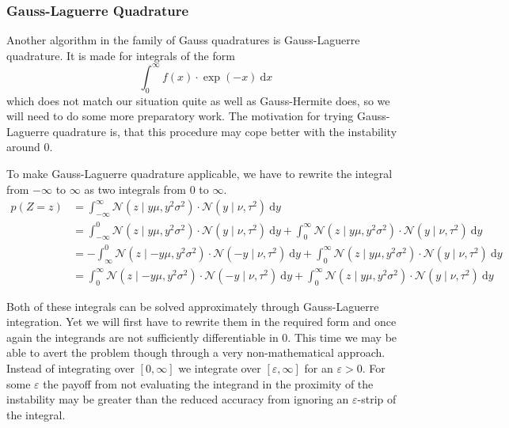 \documentclass[11pt,a4paper]{book}
\begin{document}
\subsubsection{Gauss-Laguerre Quadrature}
\label{sec:gaussians-laguerre}

Another algorithm in the family of Gauss quadratures is Gauss-Laguerre
quadrature. It is made for integrals of the form
\begin{equation*}
  \int_{0}^{\infty} f(x) \cdot \exp(-x)~\mathrm{d}x
\end{equation*}
which does not match our situation quite as well as Gauss-Hermite does, so we
will need to do some more preparatory work. The motivation for trying
Gauss-Laguerre quadrature is, that this procedure may cope better with the
instability around $0$.

To make Gauss-Laguerre quadrature applicable, we have to rewrite the integral
from $-\infty$ to $\infty$ as two integrals from $0$ to $\infty$.
\begin{align*}
  p(Z = z) & = \int_{-\infty}^{\infty} \mathcal{N}\left( z \mid y\mu, y^{2}\sigma^{2} \right) \cdot \mathcal{N}(y \mid \nu, \tau^{2})~\mathrm{d}y\\
           & = \int_{-\infty}^{0} \mathcal{N}\left( z \mid y\mu, y^{2}\sigma^{2} \right) \cdot \mathcal{N}(y \mid \nu, \tau^{2})~\mathrm{d}y + \int_{0}^{\infty} \mathcal{N}\left( z \mid y\mu, y^{2}\sigma^{2} \right) \cdot \mathcal{N}(y \mid \nu, \tau^{2})~\mathrm{d}y\\
           & = -\int_{\infty}^{0} \mathcal{N}\left( z \mid -y\mu, y^{2}\sigma^{2} \right) \cdot \mathcal{N}(-y \mid \nu, \tau^{2})~\mathrm{d}y + \int_{0}^{\infty} \mathcal{N}\left( z \mid y\mu, y^{2}\sigma^{2} \right) \cdot \mathcal{N}(y \mid \nu, \tau^{2})~\mathrm{d}y\\
           & = \int_{0}^{\infty} \mathcal{N}\left( z \mid -y\mu, y^{2}\sigma^{2} \right) \cdot \mathcal{N}(-y \mid \nu, \tau^{2})~\mathrm{d}y + \int_{0}^{\infty} \mathcal{N}\left( z \mid y\mu, y^{2}\sigma^{2} \right) \cdot \mathcal{N}(y \mid \nu, \tau^{2})~\mathrm{d}y
\end{align*}

Both of these integrals can be solved approximately through Gauss-Laguerre
integration. Yet we will first have to rewrite them in the required form and
once again the integrands are not sufficiently differentiable in $0$. This time
we may be able to avert the problem though through a very non-mathematical
approach. Instead of integrating over $[0, \infty]$ we integrate over
$[\varepsilon, \infty]$ for an $\varepsilon > 0$. For some $\varepsilon$ the
payoff from not evaluating the integrand in the proximity of the instability may
be greater than the reduced accuracy from ignoring an $\varepsilon$-strip of the
integral.
\end{document}
